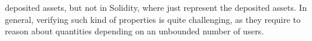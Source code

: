 deposited 
assets, %
but not in Solidity, where  just {represent}  the deposited assets. %
In general, verifying such kind of properties is quite challenging, as they require to reason about quantities depending on an unbounded number of users.

 




